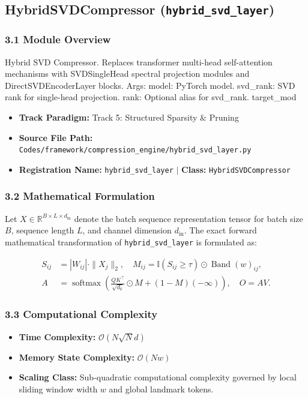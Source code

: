\subsection{HybridSVDCompressor (\texttt{hybrid\_svd\_layer})}
\label{sec:app_module_hybrid\_svd\_layer}

\subsubsection*{3.1 Module Overview}
Hybrid SVD Compressor.  Replaces transformer multi-head self-attention mechanisms with SVDSingleHead spectral projection modules and DirectSVDEncoderLayer blocks.  Args:     model: PyTorch model.     svd\_rank: SVD rank for single-head projection.     rank: Optional alias for svd\_rank.     target\_mod
\begin{itemize}
    \item \textbf{Track Paradigm:} Track 5: Structured Sparsity & Pruning
    \item \textbf{Source File Path:} \texttt{Codes/framework/compression\_engine/hybrid\_svd\_layer.py}
    \item \textbf{Registration Name:} \texttt{hybrid\_svd\_layer} $\mid$ \textbf{Class:} \texttt{HybridSVDCompressor}
\end{itemize}

\subsubsection*{3.2 Mathematical Formulation}
Let $X \in \mathbb{R}^{B \times L \times d_{\text{in}}}$ denote the batch sequence representation tensor for batch size $B$, sequence length $L$, and channel dimension $d_{\text{in}}$. The exact forward mathematical transformation of \texttt{hybrid\_svd\_layer} is formulated as:

\begin{align}
S_{ij} &= |W_{ij}| \cdot \|X_j\|_2, \quad M_{ij} = \mathbb{I}(S_{ij} \ge \tau) \odot \operatorname{Band}(w)_{ij}, \\
A &= \operatorname{softmax}\left(\frac{Q K^\top}{\sqrt{d_k}} \odot M + (1 - M)(-\infty)\right), \quad O = A V.
\end{align}


\subsubsection*{3.3 Computational Complexity}
\begin{itemize}
    \item \textbf{Time Complexity:} $\mathcal{O}(N \sqrt{N} d)$
    \item \textbf{Memory State Complexity:} $\mathcal{O}(N w)$
    \item \textbf{Scaling Class:} Sub-quadratic computational complexity governed by local sliding window width $w$ and global landmark tokens.
\end{itemize}

